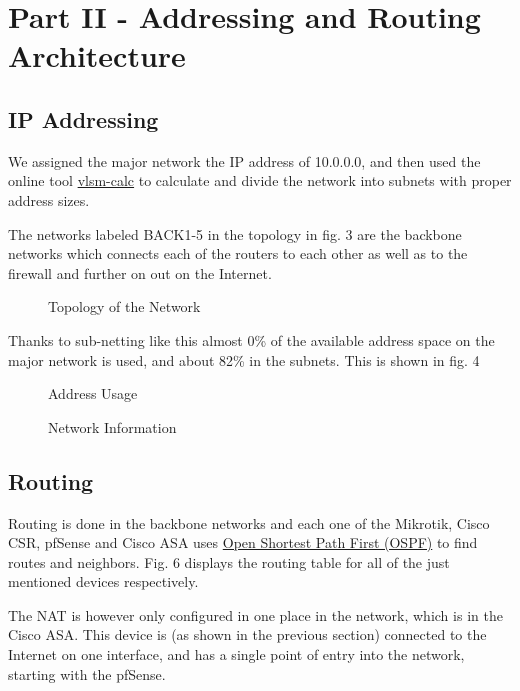 \documentclass[11pt,parskip=half]{scrartcl}
\begin{document}
\newpage
\section{Part II - Addressing and Routing Architecture}

\subsection{IP Addressing}

We assigned the major network the IP address of 10.0.0.0, and then used the online
tool \href{http://vlsm-calc.net/}{vlsm-calc} to calculate and divide the network into 
subnets with proper address sizes. 

The networks labeled BACK1-5 in the topology in
fig. 3 are the backbone networks which connects each of the routers to each other as 
well as to the firewall and further on out on the Internet.

\begin{figure}[!h]
	\centering
    \caption{Topology of the Network}
\end{figure}

Thanks to sub-netting like this almost 0\% of the available address space on the
major network is used, and about 82\% in the subnets. This is shown in fig. 4

\begin{figure}[!ht]
	\centering
    \caption{Address Usage}
\end{figure}

\begin{figure}[!ht]
    \caption{Network Information}
\end{figure}

\subsection{Routing}
Routing is done in the backbone networks and each one of the Mikrotik, Cisco CSR,
pfSense and Cisco ASA uses \href{https://en.wikipedia.org/wiki/Open_Shortest_Path_First}{Open Shortest Path First (OSPF)} to find routes and neighbors. Fig. 6 displays the routing table for all of the just mentioned devices respectively.

The NAT is however only configured in one place in the network, which is in the
Cisco ASA. This device is (as shown in the previous section) connected to the
Internet on one interface, and has a single point of entry into the network,
starting with the pfSense.
\end{document}
